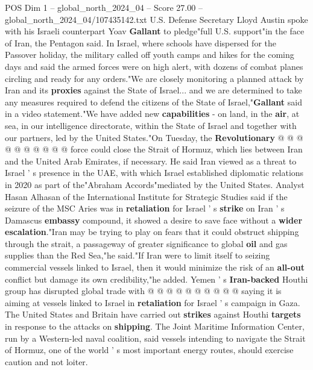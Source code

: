\begin{textsample}{POS Dim 1 – global\_north\_2024\_04 – Score 27.00 – global\_north\_2024\_04/107435142.txt}
U.S.
Defense Secretary Lloyd Austin spoke with his Israeli counterpart Yoav \textbf{Gallant} to pledge"full U.S. support"in the face of Iran, the Pentagon said.
In Israel, where schools have dispersed for the Passover holiday, the military called off youth camps and hikes for the coming days and said the armed forces were on high alert, with dozens of combat planes circling and ready for any orders."We are closely monitoring a planned attack by Iran and its \textbf{proxies} against the State of Israel... and we are determined to take any measures required to defend the citizens of the State of Israel,"\textbf{Gallant} said in a video statement."We have added new \textbf{capabilities} - on land, in the \textbf{air}, at sea, in our intelligence directorate, within the State of Israel and together with our partners, led by the United States."On Tuesday, the \textbf{Revolutionary} @ @ @ @ @ @ @ @ @ @ force could close the Strait of Hormuz, which lies between Iran and the United Arab Emirates, if necessary.
He said Iran viewed as a threat to Israel ' s presence in the UAE, with which Israel established diplomatic relations in 2020 as part of the"Abraham Accords"mediated by the United States.
Analyst Hasan Alhasan of the International Institute for Strategic Studies said if the seizure of the MSC Aries was in \textbf{retaliation} for Israel ' s \textbf{strike} on Iran ' s Damascus \textbf{embassy} compound, it showed a desire to save face without a \textbf{wider} \textbf{escalation}."Iran may be trying to play on fears that it could obstruct shipping through the strait, a passageway of greater significance to global \textbf{oil} and gas supplies than the Red Sea,"he said."If Iran were to limit itself to seizing commercial vessels linked to Israel, then it would minimize the risk of an \textbf{all-out} conflict but damage its own credibility,"he added.
Yemen ' s \textbf{Iran-backed} Houthi group has disrupted global trade with @ @ @ @ @ @ @ @ @ @ saying it is aiming at vessels linked to Israel in \textbf{retaliation} for Israel ' s campaign in Gaza.
The United States and Britain have carried out \textbf{strikes} against Houthi \textbf{targets} in response to the attacks on \textbf{shipping}.
The Joint Maritime Information Center, run by a Western-led naval coalition, said vessels intending to navigate the Strait of Hormuz, one of the world ' s most important energy routes, should exercise caution and not loiter.

\end{textsample}
